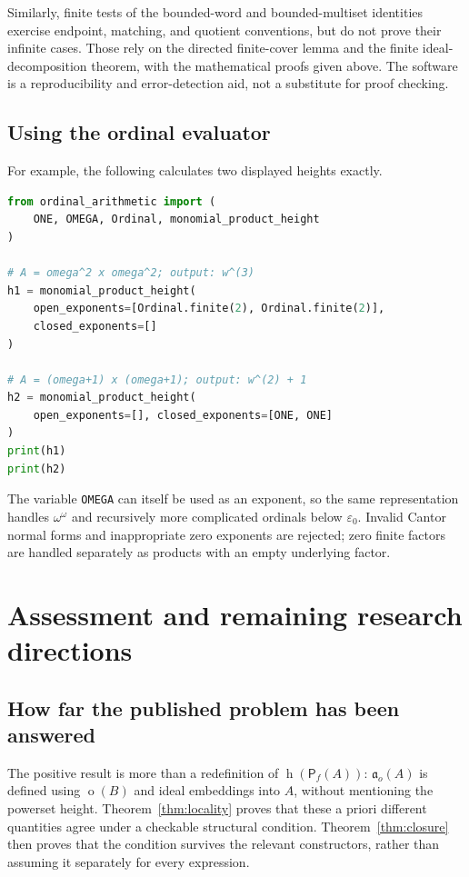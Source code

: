 \documentclass[11pt,letterpaper]{article}
\theoremstyle{teal}
\theoremstyle{definition}
\newcommand{\Pf}{\mathsf P_{\!f}}
\newcommand{\hgt}{\operatorname{h}}
\newcommand{\mot}{\operatorname{o}}
\newcommand{\ao}{\mathfrak a_o}
\newcommand{\eps}{\varepsilon}
\begin{document}
Similarly, finite tests of the bounded-word and bounded-multiset identities exercise endpoint, matching, and quotient conventions, but do not prove their infinite cases. Those rely on the directed finite-cover lemma and the finite ideal-decomposition theorem, with the mathematical proofs given above. The software is a reproducibility and error-detection aid, not a substitute for proof checking.

\subsection{Using the ordinal evaluator}
For example, the following calculates two displayed heights exactly.
\begin{lstlisting}[language=Python]
from ordinal_arithmetic import (
    ONE, OMEGA, Ordinal, monomial_product_height
)

# A = omega^2 x omega^2; output: w^(3)
h1 = monomial_product_height(
    open_exponents=[Ordinal.finite(2), Ordinal.finite(2)],
    closed_exponents=[]
)

# A = (omega+1) x (omega+1); output: w^(2) + 1
h2 = monomial_product_height(
    open_exponents=[], closed_exponents=[ONE, ONE]
)
print(h1)
print(h2)
\end{lstlisting}
The variable \texttt{OMEGA} can itself be used as an exponent, so the same representation handles $\omega^\omega$ and recursively more complicated ordinals below $\eps_0$. Invalid Cantor normal forms and inappropriate zero exponents are rejected; zero finite factors are handled separately as products with an empty underlying factor.

\section{Assessment and remaining research directions}
\subsection{How far the published problem has been answered}
The positive result is more than a redefinition of $\hgt(\Pf(A))$: $\ao(A)$ is defined using $\mot(B)$ and ideal embeddings into $A$, without mentioning the powerset height. Theorem~\ref{thm:locality} proves that these a priori different quantities agree under a checkable structural condition. Theorem~\ref{thm:closure} then proves that the condition survives the relevant constructors, rather than assuming it separately for every expression.
\end{document}
